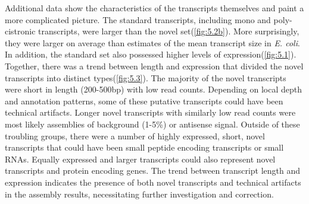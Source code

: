 Additional data show the characteristics of the transcripts themselves and paint a more complicated picture. The standard transcripts, including mono and poly-cistronic transcripts, were larger than the novel set(\ref{fig:5.2b}). More surprisingly, they were larger on average than estimates of the mean transcript size in \textit{E. coli}\cite{86}. In addition, the standard set also possessed higher levels of expression(\ref{fig:5.1}). Together, there was a trend between length and expression that divided the novel transcripts into distinct types(\ref{fig:5.3}). The majority of the novel transcripts were short in length (200-500bp) with low read counts. Depending on local depth and annotation patterns, some of these putative transcripts could have been technical artifacts. Longer novel transcripts with similarly low read counts were most likely assemblies of background (1-5\%) or antisense signal. Outside of these troubling groups, there were a number of highly expressed, short, novel transcripts that could have been small peptide encoding transcripts or small RNAs. Equally expressed and larger transcripts could also represent novel transcripts and protein encoding genes. The trend between transcript length and expression indicates the presence of both novel transcripts and technical artifacts in the assembly results, necessitating further investigation and correction.



